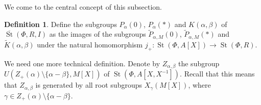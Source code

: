 \documentclass[oneside, 8pt]{amsart}
\theoremstyle{remark}
\theoremstyle{definition}
\numberwithin{lemma}{section}
\numberwithin{prop}{section}
\numberwithin{corollary}{section}
\numberwithin{externaltheorem}{section}
\newtheorem{df}[lemma]{Definition} \Crefname{df}{Definition}{Definitions}
\DeclareMathOperator{\St}{St}
\numberwithin{equation}{section}
\begin{document}
We come to the central concept of this subsection.
\begin{df} Define the subgroups $P_\alpha(0)$, $P_{\alpha}(*)$ and $K(\alpha, \beta)$ of $\overline{\St}(\Phi, R, I)$ as the images of the subgroups $\widetilde{P}_{\alpha, M}(0)$, $\widetilde{P}_{\alpha, M}(*)$ and $\widetilde{K}(\alpha, \beta)$ under the natural homomorphism $j_+ \colon \St(\Phi, A[X]) \to \St(\Phi, R)$.\end{df}

We need one more technical definition. Denote by $Z_{\alpha, \beta}$ the subgroup $U(Z_+(\alpha) \setminus \{\alpha - \beta \}, M[X])$ of $\St(\Phi, A[X, X^{-1}])$.  Recall that this means that $Z_{\alpha, \beta}$ is generated by all root subgroups $X_\gamma(M[X])$, where $\gamma \in Z_+(\alpha) \setminus \{ \alpha - \beta \}$. 
  
\end{document}
